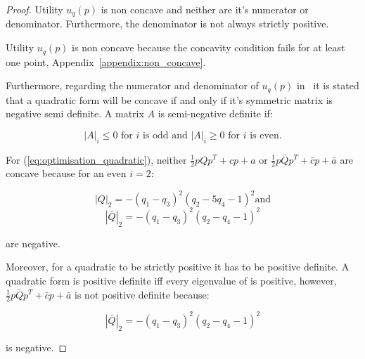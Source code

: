 \begin{proof} Utility \(u_q(p)\) is non concave and neither are it's numerator or
denominator. Furthermore, the denominator is not always strictly positive.

Utility \(u_q(p)\) is non concave because the concavity condition fails for at
least one point, Appendix~\ref{appendix:non_concave}.

Furthermore, regarding the numerator and denominator of \(u_q(p)\)
in~\cite{Anton2014} it is stated that a quadratic form will be concave if and
only if it's symmetric matrix is negative semi definite. A matrix \(A\) is
semi-negative definite if:

\begin{equation}\label{def:semi_negative}
|A|_i \leq 0 \text{ for } i \text{ is odd and } |A|_i \geq 0  \text{ for } i
\text{ is even.}
\end{equation}

For (\ref{eq:optimisation_quadratic}), neither \(\frac{1}{2}pQp^T + cp + a\)
or \(\frac{1}{2}p\bar{Q}p^T + \bar{c}p + \bar{a}\) are concave because for an even \(i=2\):

\[|Q|_2 = - \left(q_{1} - q_{3}\right)^{2} \left(q_{2} - 5 q_{4} - 1\right)^{2} \text{and}\]
\[|\bar{Q}|_2 =- \left(q_{1} - q_{3}\right)^{2} \left(q_{2} - q_{4} - 1\right)^{2}\]

are negative.

Moreover, for a quadratic to be strictly positive it has to be positive definite.
A quadratic form is positive definite iff every eigenvalue of is positive,
however, \(\frac{1}{2}p\bar{Q}p^T + \bar{c}p + \bar{a}\) is not positive definite
because:

\[|\bar{Q}|_2 =- \left(q_{1} - q_{3}\right)^{2} \left(q_{2} - q_{4} - 1\right)^{2}\]

is negative.
\end{proof}